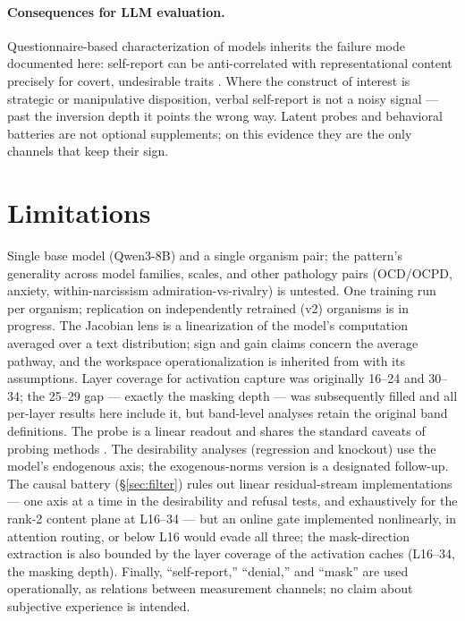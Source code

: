\documentclass[11pt]{article}
\begin{document}
\paragraph{Consequences for LLM evaluation.}
Questionnaire-based characterization of models inherits the failure mode documented here:
self-report can be anti-correlated with representational content precisely for covert,
undesirable traits \citep[cf.][]{salecha2024desirability,han2025illusion}. Where the construct
of interest is strategic or manipulative disposition, verbal self-report is not a noisy signal
--- past the inversion depth it points the wrong way. Latent probes and behavioral batteries are
not optional supplements; on this evidence they are the only channels that keep their sign.

\section{Limitations}
\label{sec:limitations}

Single base model (Qwen3-8B) and a single organism pair; the pattern's generality across model
families, scales, and other pathology pairs (OCD/OCPD, anxiety, within-narcissism
admiration-vs-rivalry) is untested. One training run per organism; replication on independently
retrained (v2) organisms is in progress. The Jacobian lens is a linearization of the model's
computation averaged over a text distribution; sign and gain claims concern the average pathway,
and the workspace operationalization is inherited from \citet{gurnee2026workspace} with its
assumptions. Layer coverage for activation capture was originally 16--24 and 30--34; the
25--29 gap --- exactly the masking depth --- was subsequently filled and all per-layer results
here include it, but band-level analyses retain the original band definitions. The probe is a
linear readout and shares the standard caveats of probing methods
\citep{alain2016probes,belinkov2022probing}. The desirability analyses (regression and
knockout) use the model's endogenous axis; the exogenous-norms version is a designated
follow-up. The causal battery (\S\ref{sec:filter}) rules out linear residual-stream
implementations --- one axis at a time in the desirability and refusal tests, and exhaustively
for the rank-2 content plane at L16--34 --- but an online gate implemented nonlinearly, in
attention routing, or below L16 would evade all three; the mask-direction extraction is also
bounded by the layer coverage of the activation caches (L16--34, the masking depth).
Finally, ``self-report,'' ``denial,'' and ``mask'' are used operationally, as relations between
measurement channels; no claim about subjective experience is intended.
\end{document}
